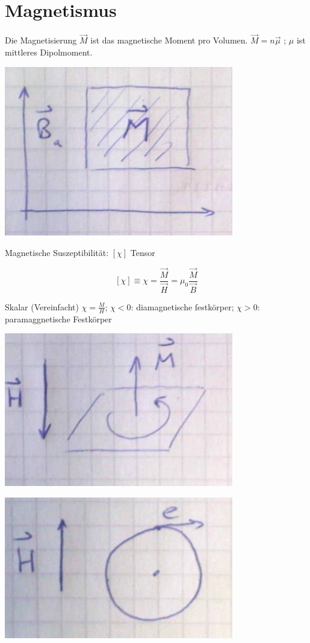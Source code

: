 \chapter{Magnetismus}

Die Magnetisierung \(\vec M\) ist das magnetische Moment pro Volumen. \(\vec M = n\vec\mu\) ; \(\mu\) ist mittleres Dipolmoment.


\includegraphics[width=0.75\textwidth]{kap12_01.png}


Magnetische Suszeptibilität: \([\chi]\) Tensor

\[[\chi]\equiv \chi = \frac{\vec M}{\vec H} = \mu_0\frac{\vec M}{\vec B} \]

Skalar (Vereinfacht) \(\chi= \frac{M}{H}\); \(\chi < 0 \): diamagnetische festkörper; \(\chi>0\): paramaggnetische Festkörper

\includegraphics[width=0.75\textwidth]{kap12_02.png}


\includegraphics[width=0.75\textwidth]{kap12_03.png}


